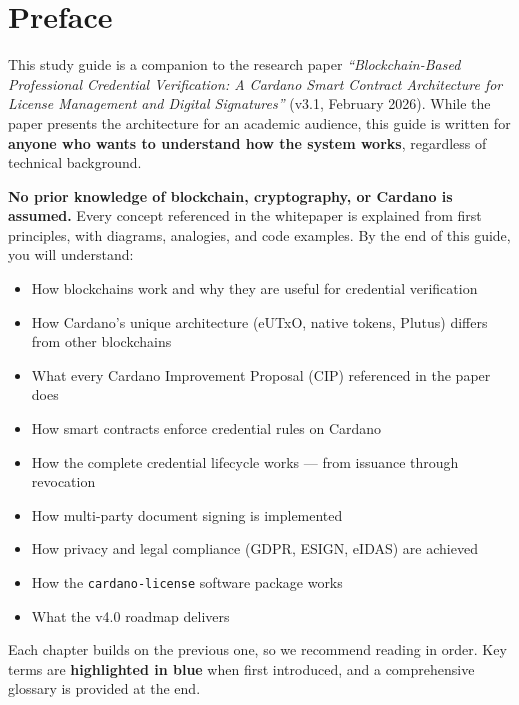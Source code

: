 \documentclass[11pt, oneside]{report}
\newcommand{\keyterm}[1]{\textbf{\textcolor{chaptercolor}{#1}}}
\begin{document}
\tableofcontents
\newpage

\chapter*{Preface}

This study guide is a companion to the research paper \textit{``Blockchain-Based Professional Credential Verification: A Cardano Smart Contract Architecture for License Management and Digital Signatures''} (v3.1, February 2026). While the paper presents the architecture for an academic audience, this guide is written for \textbf{anyone who wants to understand how the system works}, regardless of technical background.

\textbf{No prior knowledge of blockchain, cryptography, or Cardano is assumed.} Every concept referenced in the whitepaper is explained from first principles, with diagrams, analogies, and code examples. By the end of this guide, you will understand:

\begin{itemize}[nosep]
  \item How blockchains work and why they are useful for credential verification
  \item How Cardano's unique architecture (eUTxO, native tokens, Plutus) differs from other blockchains
  \item What every Cardano Improvement Proposal (CIP) referenced in the paper does
  \item How smart contracts enforce credential rules on Cardano
  \item How the complete credential lifecycle works --- from issuance through revocation
  \item How multi-party document signing is implemented
  \item How privacy and legal compliance (GDPR, ESIGN, eIDAS) are achieved
  \item How the \texttt{cardano-license} software package works
  \item What the v4.0 roadmap delivers
\end{itemize}

Each chapter builds on the previous one, so we recommend reading in order. Key terms are \keyterm{highlighted in blue} when first introduced, and a comprehensive glossary is provided at the end.
\end{document}
